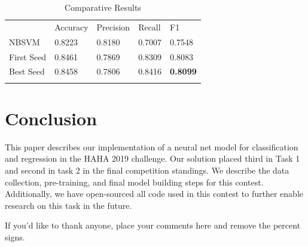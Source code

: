 \documentclass[smallextended]{svjour3}       %
\begin{document}
\begin{table}[ht]
	\caption{Comparative Results}
	\label{tab:tab_results}
	\begin{tabular}{lllll}
		\hline\noalign{\smallskip}
		 & Accuracy & Precision & Recall & F1 \\
		\noalign{\smallskip}\hline\noalign{\smallskip}
NBSVM &      0.8223 & 0.8180 & 0.7007 & 0.7548 \\
First Seed & 0.8461 & 0.7869 & 0.8309 & 0.8083 \\
Best Seed &  0.8458 & 0.7806 & 0.8416 & \textbf{0.8099} \\
		\noalign{\smallskip}\hline
	\end{tabular}
\end{table}

\section{Conclusion}
\label{sec:5}
This paper describes our implementation of a neural net model for classification and regression in the HAHA 2019 challenge.  Our solution placed third in Task 1 and second in task 2 in the final competition standings.  We describe the data collection, pre-training, and final model building steps for this contest.  Additionally, we have open-sourced all  code used in this contest to further enable research on this task in the future.

\begin{acknowledgements}
If you'd like to thank anyone, place your comments here
and remove the percent signs.
\end{acknowledgements}


%
%



\end{document}

